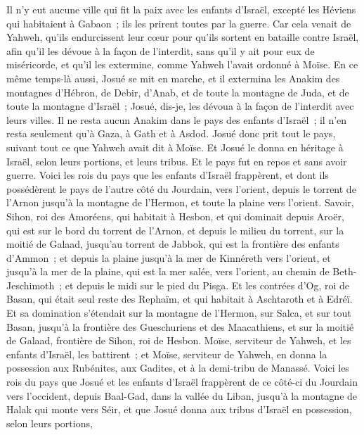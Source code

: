\begin{multicols}{2}
Il n'y eut aucune ville qui fit la paix avec les enfants d'Israël, excepté les Héviens qui habitaient à Gabaon~; ils les prirent toutes par la guerre.
Car cela venait de Yahweh, qu'ils endurcissent leur cœur pour qu'ils sortent en bataille contre Israël, afin qu'il les dévoue à la façon de l'interdit, sans qu'il y ait pour eux de miséricorde, et qu'il les extermine, comme Yahweh l'avait ordonné à Moïse.
En ce même temps-là aussi, Josué se mit en marche, et il extermina les Anakim des montagnes d'Hébron, de Debir, d'Anab, et de toute la montagne de Juda, et de toute la montagne d'Israël~; Josué, dis-je, les dévoua à la façon de l'interdit avec leurs villes.
Il ne resta aucun Anakim dans le pays des enfants d'Israël~; il n'en resta seulement qu'à Gaza, à Gath et à Asdod.
Josué donc prit tout le pays, suivant tout ce que Yahweh avait dit à Moïse. Et Josué le donna en héritage à Israël, selon leurs portions, et leurs tribus. Et le pays fut en repos et sans avoir guerre.
\VerseOne{}Voici les rois du pays que les enfants d'Israël frappèrent, et dont ils possédèrent le pays de l'autre côté du Jourdain, vers l'orient, depuis le torrent de l'Arnon jusqu'à la montagne de l'Hermon, et toute la plaine vers l'orient.
Savoir, Sihon, roi des Amoréens, qui habitait à Hesbon, et qui dominait depuis Aroër, qui est sur le bord du torrent de l'Arnon, et depuis le milieu du torrent, sur la moitié de Galaad, jusqu'au torrent de Jabbok, qui est la frontière des enfants d'Ammon~;
et depuis la plaine jusqu'à la mer de Kinnéreth vers l'orient, et jusqu'à la mer de la plaine, qui est la mer salée, vers l'orient, au chemin de Beth-Jeschimoth~; et depuis le midi sur le pied du Pisga.
Et les contrées d'Og, roi de Basan, qui était seul reste des Rephaïm, et qui habitait à Aschtaroth et à Edréï.
Et sa domination s'étendait sur la montagne de l'Hermon, sur Salca, et sur tout Basan, jusqu'à la frontière des Gueschuriens et des Maacathiens, et sur la moitié de Galaad, frontière de Sihon, roi de Hesbon.
Moïse, serviteur de Yahweh, et les enfants d'Israël, les battirent~; et Moïse, serviteur de Yahweh, en donna la possession aux Rubénites, aux Gadites, et à la demi-tribu de Manassé.
Voici les rois du pays que Josué et les enfants d'Israël frappèrent de ce côté-ci du Jourdain vers l'occident, depuis Baal-Gad, dans la vallée du Liban, jusqu'à la montagne de Halak qui monte vers Séir, et que Josué donna aux tribus d'Israël en possession, selon leurs portions,

\end{multicols}
